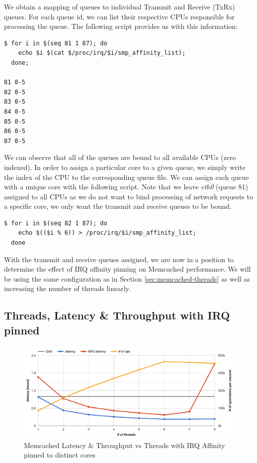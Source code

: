 We obtain a mapping of queues to individual Transmit and Receive (TxRx) queues. For each queue id, we can list their respective CPUs responsible for processing the queue. The following script provides us with this information:

\begin{lstlisting}
$ for i in $(seq 81 1 87); do
    echo $i $(cat $/proc/irq/$i/smp_affinity_list);
  done;

81 0-5
82 0-5
83 0-5
84 0-5
85 0-5
86 0-5
87 0-5
\end{lstlisting}

We can observe that all of the queues are bound to all available CPUs (zero indexed). In order to assign a particular core to a given queue, we simply write the index of the CPU to the corresponding queue file. We can assign each queue with a unique core with the following script. Note that we leave \textit{eth0} (queue 81) assigned to all CPUs as we do not want to bind processing of network requests to a specific core, we only want the transmit and receive queues to be bound.

\begin{lstlisting}
$ for i in $(seq 82 1 87); do
    echo $(($i % 6)) > /proc/irq/$i/smp_affinity_list;
  done
\end{lstlisting}

With the transmit and receive queues assigned, we are now in a position to determine the effect of IRQ affinity pinning on Memcached performance. We will be using the same configuration as in Section \ref{sec:memcached-threads} as well as increasing the number of threads linearly.

\subsection{Threads, Latency \& Throughput with IRQ pinned}

\begin{figure}[h]
    \includegraphics[width=\textwidth]{./res2/m_threads_irq_latency.png}
    \caption{Memcached Latency \& Throughput vs Threads with IRQ Affinity pinned to distinct cores}
    \label{fig:m_threads_irq_latency}
\end{figure}

